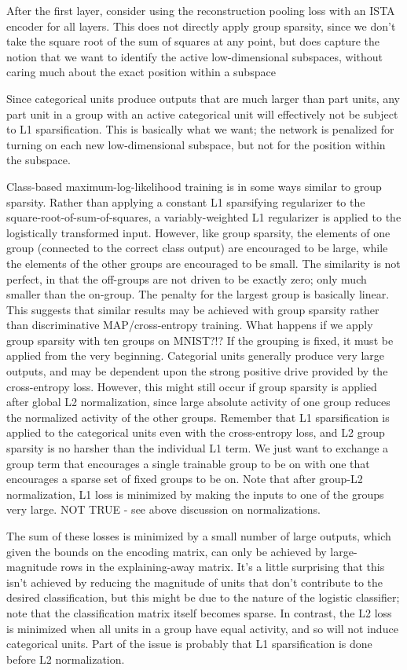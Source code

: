 After the first layer, consider using the reconstruction pooling loss with an ISTA encoder for all layers.  This does not directly apply group sparsity, since we don't take the square root of the sum of squares at any point, but does capture the notion that we want to identify the active low-dimensional subspaces, without caring much about the exact position within a subspace

Since categorical units produce outputs that are much larger than part units, any part unit in a group with an active categorical unit will effectively not be subject to L1 sparsification.  This is basically what we want; the network is penalized for turning on each new low-dimensional subspace, but not for the position within the subspace.  

Class-based maximum-log-likelihood training is in some ways similar to group sparsity.  Rather than applying a constant L1 sparsifying regularizer to the square-root-of-sum-of-squares, a variably-weighted L1 regularizer is applied to the logistically transformed input.  However, like group sparsity, the elements of one group (connected to the correct class output) are encouraged to be large, while the elements of the other groups are encouraged to be small.  The similarity is not perfect, in that the off-groups are not driven to be exactly zero; only much smaller than the on-group.  The penalty for the largest group is basically linear.  This suggests that similar results may be achieved with group sparsity rather than discriminative MAP/cross-entropy training.  What happens if we apply group sparsity with ten groups on MNIST?!?  If the grouping is fixed, it must be applied from the very beginning.  Categorial units generally produce very large outputs, and may be dependent upon the strong positive drive provided by the cross-entropy loss.  However, this might still occur if group sparsity is applied after global L2 normalization, since large absolute activity of one group reduces the normalized activity of the other groups.  Remember that L1 sparsification is applied to the categorical units even with the cross-entropy loss, and L2 group sparsity is no harsher than the individual L1 term.  We just want to exchange a group term that encourages a single trainable group to be on with one that encourages a sparse set of fixed groups to be on.  Note that after group-L2 normalization, L1 loss is minimized by making the inputs to one of the groups very large.  NOT TRUE - see above discussion on normalizations.


The sum of these losses is minimized by a small number of large outputs, which given the bounds on the encoding matrix, can only be achieved by large-magnitude rows in the explaining-away matrix.  It's a little surprising that this isn't achieved by reducing the magnitude of units that don't contribute to the desired classification, but this might be due to the nature of the logistic classifier; note that the classification matrix itself becomes sparse.  In contrast, the L2 loss is minimized when all units in a group have equal activity, and so will not induce categorical units.  Part of the issue is probably that L1 sparsification is done before L2 normalization.  




